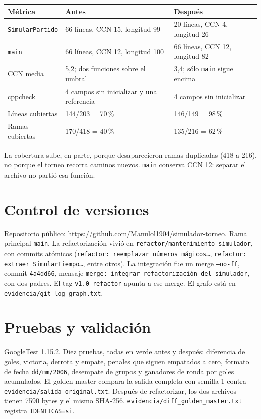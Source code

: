 \documentclass[10pt,a4paper]{article}
\begin{document}
\begin{center}
\scriptsize
\begin{tabular}{|p{4.2cm}|p{5.2cm}|p{5.2cm}|}
\hline
M\'etrica & Antes & Despu\'es \\
\hline
\texttt{SimularPartido} & 66 l\'ineas, CCN 15, longitud 99 & 20 l\'ineas, CCN 4, longitud 26 \\
\hline
\texttt{main} & 66 l\'ineas, CCN 12, longitud 100 & 66 l\'ineas, CCN 12, longitud 82 \\
\hline
CCN media & 5,2; dos funciones sobre el umbral & 3,4; s\'olo \texttt{main} sigue encima \\
\hline
cppcheck & 4 campos sin inicializar y una referencia & 4 campos sin inicializar \\
\hline
L\'ineas cubiertas & 144/203 = 70\,\% & 146/149 = 98\,\% \\
\hline
Ramas cubiertas & 170/418 = 40\,\% & 135/216 = 62\,\% \\
\hline
\end{tabular}
\end{center}

La cobertura sube, en parte, porque desaparecieron ramas duplicadas (418 a 216), no porque el torneo recorra caminos nuevos. \texttt{main} conserva CCN 12: separar el archivo no parti\'o esa funci\'on.

\section{Control de versiones}
Repositorio p\'ublico: \url{https://github.com/Manulol1904/simulador-torneo}. Rama principal \texttt{main}. La refactorizaci\'on vivi\'o en \texttt{refactor/mantenimiento-simulador}, con commits at\'omicos (\texttt{refactor: reemplazar n\'umeros m\'agicos\ldots}, \texttt{refactor: extraer SimularTiempo\ldots}, entre otros). La integraci\'on fue un merge \texttt{--no-ff}, commit \texttt{4a4dd66}, mensaje \texttt{merge: integrar refactorizaci\'on del simulador}, con dos padres. El tag \texttt{v1.0-refactor} apunta a ese merge. El grafo est\'a en \texttt{evidencia/git\_log\_graph.txt}.

\section{Pruebas y validaci\'on}
GoogleTest 1.15.2. Diez pruebas, todas en verde antes y despu\'es: diferencia de goles, victoria, derrota y empate, penales que siguen empatados a cero, formato de fecha \texttt{dd/mm/2006}, desempate de grupos y ganadores de ronda por goles acumulados. El golden master compara la salida completa con semilla 1 contra \texttt{evidencia/salida\_original.txt}. Despu\'es de refactorizar, los dos archivos tienen 7590 bytes y el mismo SHA-256. \texttt{evidencia/diff\_golden\_master.txt} registra \texttt{IDENTICAS=si}.
\end{document}

